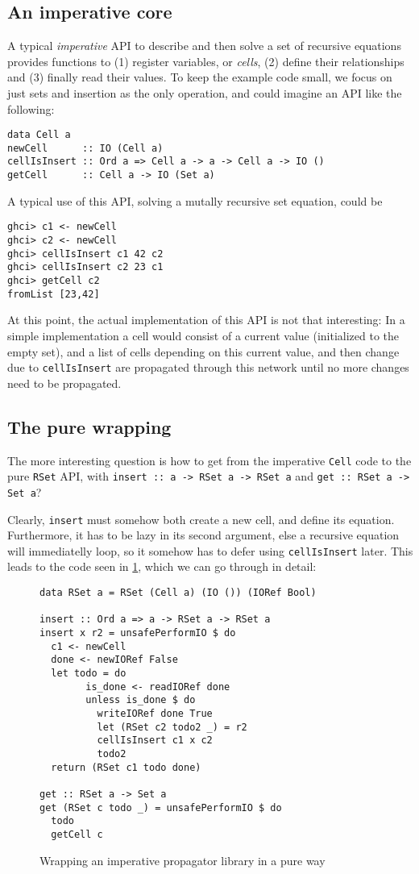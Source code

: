 \documentclass[manuscript,screen,acmsmall]{acmart}
\begin{document}
\subsection{An imperative core}\label{sec:impcore}

A typical \emph{imperative} API to describe and then solve a set of recursive equations provides functions to (1) register variables, or \emph{cells}, (2) define their relationships and (3) finally read their values. To keep the example code small, we focus on just sets and insertion as the only operation, and could imagine an API like the following:
\begin{verbatim}
data Cell a
newCell      :: IO (Cell a)
cellIsInsert :: Ord a => Cell a -> a -> Cell a -> IO ()
getCell      :: Cell a -> IO (Set a)
\end{verbatim}

A typical use of this API, solving a mutally recursive set equation, could be
\begin{verbatim}
ghci> c1 <- newCell
ghci> c2 <- newCell
ghci> cellIsInsert c1 42 c2
ghci> cellIsInsert c2 23 c1
ghci> getCell c2
fromList [23,42]
\end{verbatim}

At this point, the actual implementation of this API is not that interesting: In a simple implementation a cell would consist of a current value (initialized to the empty set), and a list of cells depending on this current value, and then change due to \verb|cellIsInsert| are propagated through this network until no more changes need to be propagated.

\subsection{The pure wrapping}

The more interesting question is how to get from the imperative \verb|Cell| code to the pure \verb|RSet| API, with \verb|insert :: a -> RSet a -> RSet a| and \verb|get :: RSet a -> Set a|?

Clearly, \verb|insert| must somehow both create a new cell, and define its equation.
Furthermore, it has to be lazy in its second argument, else a recursive equation will immediatelly loop, so it somehow has to defer using \verb|cellIsInsert| later. This leads to the code seen in \cref{fig:wrap}, which we can go through in detail:

\begin{figure}
\begin{verbatim}
data RSet a = RSet (Cell a) (IO ()) (IORef Bool)

insert :: Ord a => a -> RSet a -> RSet a
insert x r2 = unsafePerformIO $ do
  c1 <- newCell
  done <- newIORef False
  let todo = do
        is_done <- readIORef done
        unless is_done $ do
          writeIORef done True
          let (RSet c2 todo2 _) = r2
          cellIsInsert c1 x c2
          todo2
  return (RSet c1 todo done)

get :: RSet a -> Set a
get (RSet c todo _) = unsafePerformIO $ do
  todo
  getCell c
\end{verbatim}
\caption{Wrapping an imperative propagator library in a pure way}\label{fig:wrap}
\end{figure}
\end{document}

